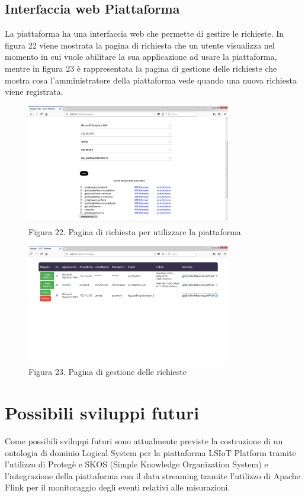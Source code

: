 \subsection{Interfaccia web Piattaforma}
La piattaforma ha una interfaccia web che permette di gestire le richieste. In figura 22 viene mostrata la pagina di richiesta che un utente visualizza nel momento in cui vuole abilitare la sua applicazione ad usare la piattaforma, mentre in figura 23 è rappresentata la pagina di gestione delle richieste che mostra cosa l'amministratore della piattaforma vede quando una nuova richiesta viene registrata.
\begin{figure}[h]
	\centering
	\includegraphics[width=0.8\textwidth]{pagina-di-richiesta.png}
	\caption*{Figura 22. Pagina di richiesta per utilizzare la piattaforma}
\end{figure}
\begin{figure}[h]
	\centering
	\includegraphics[width=0.8\textwidth]{gestione-delle-richieste.png}
	\caption*{Figura 23. Pagina di gestione delle richieste}
\end{figure}
\section{Possibili sviluppi futuri}
Come possibili sviluppi futuri sono attualmente previste la costruzione di un ontologia di dominio Logical System per la piattaforma LSIoT Platform tramite l'utilizzo di Protegè e SKOS (Simple Knowledge Organization System) e l'integrazione della piattaforma con il data streaming tramite l'utilizzo di Apache Flink per il monitoraggio degli eventi relativi alle misurazioni.
